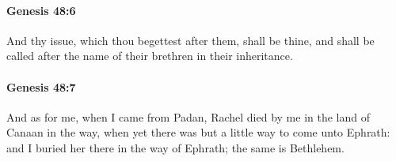 		\paragraph{Genesis 48:6} %
			\label{GENESIS-48-6}

			And thy issue, which thou begettest after them, shall be thine, and shall be called after the name of their brethren in their inheritance.


		\paragraph{Genesis 48:7} %
			\label{GENESIS-48-7}

			And as for me, when I came from Padan, Rachel died by me in the land of Canaan in the way, when yet there was but a little way to come unto Ephrath: and I buried her there in the way of Ephrath; the same is Bethlehem.


